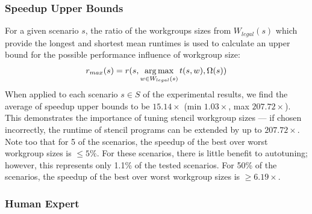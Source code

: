 \documentclass[nonatbib,preprint,10pt]{sigplanconf}
\begin{document}
\subsubsection{Speedup Upper Bounds}


For a given scenario $s$, the ratio of the workgroups sizes from
$W_{legal}(s)$ which provide the longest and shortest mean runtimes is
used to calculate an upper bound for the possible performance
influence of workgroup size:
%
\begin{equation}
r_{max}(s) = r(s, \operatorname*{arg\,max}_{w \in W_{legal}(s)} t(s,w), \Omega(s))
\end{equation}
%
When applied to each scenario $s \in S$ of the experimental results,
we find the average of speedup upper bounds to be $15.14\times$ (min
$1.03\times$, max $207.72\times$). This demonstrates the importance of
tuning stencil workgroup sizes --- if chosen incorrectly, the runtime
of stencil programs can be extended by up to $207.72\times$. Note too
that for 5 of the scenarios, the speedup of the best over worst
workgroup sizes is $\le 5\%$.
For these scenarios, there is little benefit to autotuning; however,
this represents only 1.1\% of the tested scenarios. For 50\% of the
scenarios, the speedup of the best over worst workgroup sizes is
$\ge 6.19\times$.


\subsubsection{Human Expert}
\end{document}

